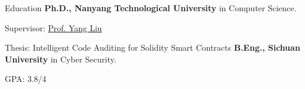 \begin{rubric}{Education}
\entry*[2021 -- 2025]%
	\textbf{Ph.D., Nanyang Technological University} in Computer Science.
        \par Supervisor: \href{https://personal.ntu.edu.sg/yangliu/}{Prof. Yang Liu}
        \par Thesis: Intelligent Code Auditing for Solidity Smart Contracts
\entry*[2017 -- 2021]%
	\textbf{B.Eng., Sichuan University} in Cyber Security.
        \par GPA: 3.8/4
\end{rubric}